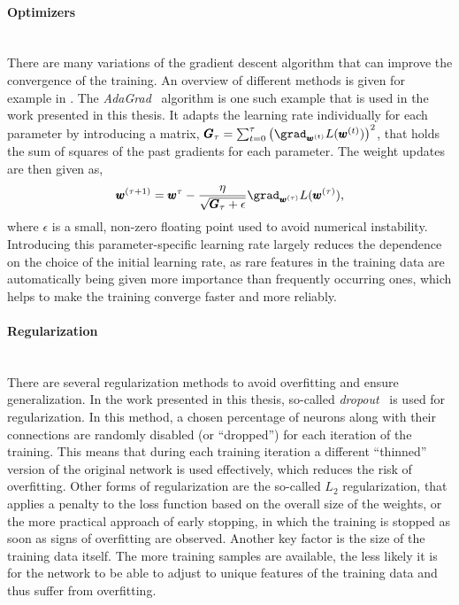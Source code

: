 \paragraph{Optimizers}\mbox{}\\
There are many variations of the gradient descent algorithm that can improve the convergence of the training. An overview of different methods is given for example in . The \emph{AdaGrad}~\cite{adagrad-duchi} algorithm is one such example that is used in the work presented in this thesis. It adapts the learning rate individually for each parameter by introducing a matrix, $\pmb{G}_{\tau} = \sum_{t=0}^{\tau} \left( \grad_{\pmb{w}^{(t)}} L(\pmb{w}^{(t)}) \right)^2$, that holds the sum of squares of the past gradients for each parameter. 
The weight updates are then given as,
\begin{equation}
    \pmb{w}^{(\tau+1)} = \pmb{w}^\tau - \frac{\eta}{\sqrt{\pmb{G}_\tau + \epsilon}}  \grad_{\pmb{w}^{(\tau)}} L(\pmb{w}^{(\tau)}), 
\end{equation}
where $\epsilon$ is a small, non-zero floating point used to avoid numerical instability.
Introducing this parameter-specific learning rate largely reduces the dependence on the choice of the initial learning rate, as rare features in the training data are automatically being given more importance than frequently occurring ones, which helps to make the training converge faster and more reliably.


\paragraph{Regularization}\mbox{}\\
There are several regularization methods to avoid overfitting and ensure generalization. 
In the work presented in this thesis, so-called \emph{dropout}~\cite{srivastava_dropout_2014,DBLP:journals/corr/abs-1207-0580} is used for regularization. In this method, a chosen percentage of neurons along with their connections are randomly disabled (or ``dropped'') for each iteration of the training. This means that during each training iteration a different ``thinned'' version of the original network is used effectively, which reduces the risk of overfitting. 
Other forms of regularization are the so-called $L_2$ regularization, that applies a penalty to the loss function based on the overall size of the weights, or the more practical approach of early stopping, in which the training is stopped as soon as signs of overfitting are observed. 
Another key factor is the size of the training data itself. The more training samples are available, the less likely it is for the network to be able to adjust to unique features of the training data and thus suffer from overfitting.


